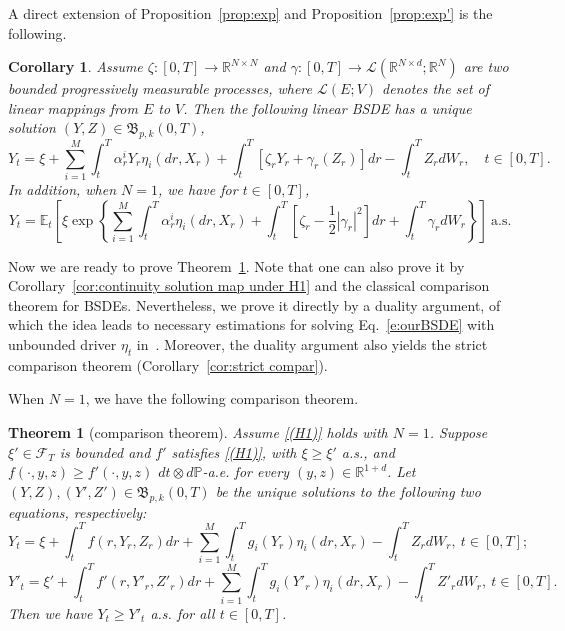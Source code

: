 \documentclass[11pt,reqno]{amsart}
\newtheorem{theorem}{Theorem}
\newtheorem{corollary}{Corollary}[section]
\numberwithin{equation}{section}
\begin{document}
A direct extension of Proposition~\ref{prop:exp} and Proposition~\ref{prop:exp'} is the following.
\begin{corollary}\label{cor:exp''}
Assume $\zeta:[0,T]\rightarrow \mathbb{R}^{N\times N}$ and $\gamma:[0,T]\rightarrow \mathscr{L}(\mathbb{R}^{N\times d};\mathbb{R}^{N})$ are two bounded progressively measurable processes, where $\mathscr{L}(E;V)$ denotes the set of linear mappings  from $E$ to $V$. Then the following linear BSDE has a unique solution $(Y,Z)\in\mathfrak{B}_{p,k}(0,T)$,
\begin{equation*}
Y_{t} = \xi + \sum_{i=1}^{M}\int_{t}^{T}\alpha^{i}_{r}Y_{r}\eta_{i}(dr,X_{r}) + \int_{t}^{T} [\zeta_{r} Y_{r} + \gamma_{r} (Z_{r})] dr - \int_{t}^{T}Z_{r}dW_{r},\quad t\in[0,T].
\end{equation*}
In addition, when $N=1$, we have for $t\in[0,T]$,
\begin{equation*}
Y_{t} = \mathbb{E}_{t}\left[\xi\exp\left\{\sum_{i=1}^{M}\int_{t}^{T}\alpha^{i}_{r}\eta_{i}(dr,X_{r}) + \int_{t}^{T}[\zeta_r - \frac{1}{2}|\gamma_r|^{2}]dr + \int_{t}^{T}\gamma_{r}dW_r\right\}\right]\ \text{a.s.}
\end{equation*}
\end{corollary}


Now we are ready to prove Theorem~\ref{thm:comparison}. Note that one can also prove it by Corollary~\ref{cor:continuity solution map under H1} and the classical comparison theorem for BSDEs. Nevertheless, we prove it directly by a duality argument, of which the idea leads to necessary estimations for solving Eq.~\eqref{e:ourBSDE} with unbounded driver $\eta_t$ in~\cite{BSDEYoung-II}. Moreover, the duality argument also yields the strict comparison theorem (Corollary~\ref{cor:strict compar}).


When $N=1$, we have the following comparison theorem. 
\begin{theorem}[comparison theorem]\label{thm:comparison}
Assume \ref{(H1)} holds with $N=1$. Suppose $\xi'\in\mathcal{F}_{T}$ is bounded and $f'$ satisfies \ref{(H1)}, with $\xi\ge \xi'$ a.s., and $f(\cdot,y,z)\ge f'(\cdot,y,z)$ $dt\otimes d\mathbb{P}$-a.e. for every $(y,z)\in \mathbb{R}^{1+d}$. Let $(Y,Z),(Y',Z')\in\mathfrak{B}_{p,k}(0,T)$ be the unique solutions to the following two equations, respectively:
\begin{equation*}
Y_{t} = \xi + \int_{t}^{T}f(r,Y_{r},Z_{r})dr + \sum_{i=1}^{M}\int_{t}^{T}g_{i}(Y_{r})\eta_{i}(dr,X_{r}) - \int_{t}^{T}Z_{r}dW_{r},\ t\in[0,T];
\end{equation*}
\begin{equation*}
Y'_{t} = \xi' + \int_{t}^{T}f'(r,Y'_{r},Z'_{r})dr + \sum_{i=1}^{M}\int_{t}^{T}g_{i}(Y'_{r})\eta_{i}(dr,X_{r}) - \int_{t}^{T}Z'_{r}dW_{r},\ t\in[0,T].
\end{equation*}
Then we have $Y_{t}\ge Y'_{t}$ a.s. for all $t\in[0,T]$.
\end{theorem}
\end{document}
